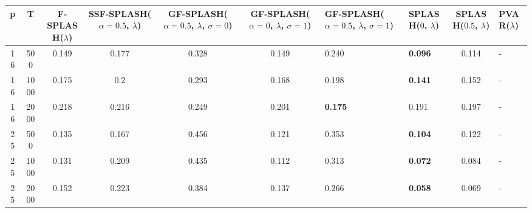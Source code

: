 \begin{tabular}{ccccccllcl}
\hline
  p  &  T   &  F-SPLASH($\lambda$)  &  SSF-SPLASH($\alpha=0.5$, $\lambda$)  &  GF-SPLASH($\alpha=0.5$, $\lambda$, $\sigma=0$)  &  GF-SPLASH($\alpha=0$, $\lambda$, $\sigma=1$)  & GF-SPLASH($\alpha=0.5$, $\lambda$, $\sigma=1$)   & SPLASH($0$, $\lambda$)   &  SPLASH($0.5$, $\lambda$)  & PVAR($\lambda$)   \\
\hline
 16  & 500  &         0.149         &                 0.177                 &                      0.328                       &                     0.149                      & 0.240                                            & \textbf{0.096}           &           0.114            & -                 \\
 16  & 1000 &         0.175         &                  0.2                  &                      0.293                       &                     0.168                      & 0.198                                            & \textbf{0.141}           &           0.152            & -                 \\
 16  & 2000 &         0.218         &                 0.216                 &                      0.249                       &                     0.201                      & \textbf{0.175}                                   & 0.191                    &           0.197            & -                 \\
 25  & 500  &         0.135         &                 0.167                 &                      0.456                       &                     0.121                      & 0.353                                            & \textbf{0.104}           &           0.122            & -                 \\
 25  & 1000 &         0.131         &                 0.209                 &                      0.435                       &                     0.112                      & 0.313                                            & \textbf{0.072}           &           0.084            & -                 \\
 25  & 2000 &         0.152         &                 0.223                 &                      0.384                       &                     0.137                      & 0.266                                            & \textbf{0.058}           &           0.069            & -                 \\
\hline
\end{tabular}